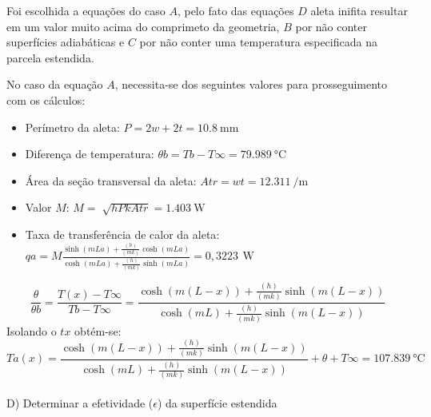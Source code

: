 Foi escolhida a equações do caso \(A\), pelo fato das equações
\(D\) aleta inifita resultar em um valor muito acima do comprimeto da
geometria,
\(B\) por não conter superfícies adiabáticas
e \(C\) por não conter uma temperatura especificada na parcela estendida.
\par No caso da equação \(A\), necessita-se dos seguintes valores
para prosseguimento com os cálculos:
\begin{itemize}[leftmargin=2cm]
    \item Perímetro da aleta: \(
          {P}={2w+2t} = \SI{10,8}{\milli\meter}
          \)
    \item Diferença de temperatura: \(
          {\theta}b={{Tb}-{T\infty}} = \SI{79,989}{\degreeCelsius}
          \)
    \item Área da seção transversal da aleta: \(
          {Atr}={{w}{t}} = \SI{12,311}{\per\meter}
          \)
    \item Valor \(M\): \(
          {M}={\sqrt[]{{h}{P}{k}{Atr}}} = \SI{1,403}{\watt}
          \)
    \item Taxa de transferência
          de calor da aleta: \\\(
          {qa}={M}{
          \frac
          {\sinh{(mLa)}+{\frac{(h)}{(mk)}}{\cosh{(mLa)}}}
          {\cosh{(mLa)}+{\frac{(h)}{(mk)}}{\sinh{(mLa)}}}
          }={0,3223\,\SI{}{\watt}}
          \)
\end{itemize}
{\ABNTEXchapterfont\Large\vspace{1cm}{C) Determinar a temperatura na ponta da aleta}}
\begin{equation}
    {\frac{\theta}{{\theta}b}}=
    {\frac
    {T(x)-{T\infty}}
    {Tb-{T\infty}}
    }=
    {
    \frac
    {\cosh{(m(L-x))}+{\frac{(h)}{(mk)}}{\sinh{(m(L-x))}}}
    {\cosh{(mL)}+{\frac{(h)}{(mk)}}{\sinh{(m(L-x))}}}
    }
\end{equation}
Isolando o \(tx\) obtém-se:
\begin{equation}
    {Ta(x)}=
    {
    \frac
    {\cosh{(m(L-x))}+{\frac{(h)}{(mk)}}{\sinh{(m(L-x))}}}
    {\cosh{(mL)}+{\frac{(h)}{(mk)}}{\sinh{(m(L-x))}}}
    }+
    {\theta}+
    {T\infty}=
    \SI{107,839}{\degreeCelsius}
\end{equation}
\\
{\ABNTEXchapterfont\Large{D) Determinar a efetividade (\(\epsilon\)) da superfície estendida}}\\

